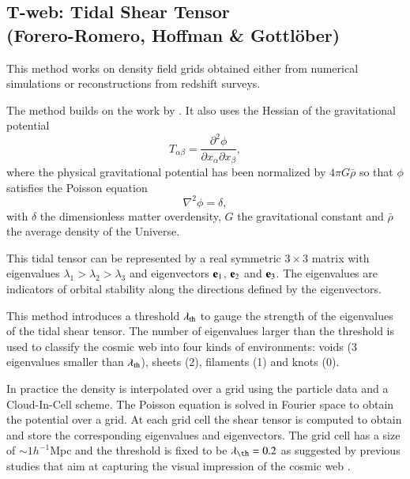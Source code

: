 \subsection{T-web: Tidal Shear Tensor\\ \hskip 0.75cm (Forero-Romero, Hoffman \& Gottl\"ober)}
\label{section:forero-romero}

This method \citep[T-web,][]{forero2009} works on density field grids
obtained either from numerical simulations or reconstructions from
redshift surveys. 

The method builds on the work by \cite{hahn2007a}. It
also uses the Hessian of the gravitational potential 
\begin{equation}
T_{\alpha\beta} = \frac{\partial^2\phi}{\partial x_\alpha\partial x_\beta},
\end{equation}
%
where the physical gravitational potential has been normalized by
$4\pi G\bar{\rho}$ so that $\phi$ satisfies the Poisson
equation
\begin{equation}
\nabla^2\phi=\delta,
\end{equation}
%
with $\delta$ the dimensionless matter overdensity, $G$ the
gravitational constant and $\bar{\rho}$ the average density of the
Universe.

This tidal tensor can be represented by a real symmetric $3\times 3$
matrix with eigenvalues $\lambda_1>\lambda_2>\lambda_3$ and
eigenvectors ${\bf e}_1$, ${\bf e}_2$ and ${\bf e}_3$. The eigenvalues
are indicators of orbital stability along the directions defined by
the eigenvectors. 

This method introduces a threshold $\lambda_{\rm th}$ to gauge the
strength of the eigenvalues of the tidal shear tensor. The number of
eigenvalues larger than the threshold is used to classify the cosmic
web into four kinds of environments: voids (3 eigenvalues smaller than
$\lambda_{\rm th}$), sheets (2), filaments (1) and knots (0).

In practice the density is interpolated over a grid using the particle
data and a Cloud-In-Cell scheme. The Poisson equation is solved in
Fourier space to obtain the potential over a grid. At each grid cell
the shear tensor is computed to obtain and store the corresponding
eigenvalues and eigenvectors. The grid cell has a size of $\sim
1h^{-1}$Mpc and the threshold is fixed to be $\lambda_{\th}=0.2$ as
suggested by previous studies that aim at capturing the visual
impression of the cosmic web \citep{forero2009}. 




